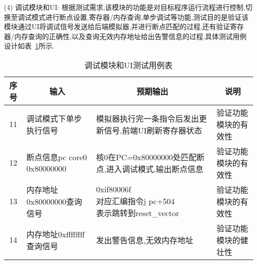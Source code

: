 (4) 调试模块和UI: 根据测试需求,该模块的功能是对目标程序运行流程进行控制,切换至调试模式进行断点设置,寄存器/内存查询,单步调试等功能,测试目的是验证该模块通过UI将调试信号发送给后端模拟器,并进行断点匹配的过程,还有验证寄存器/内存查询的正确性,以及查询无效内存地址给出告警信息的过程.具体测试用例设计如表~\ref{tab:test4}所示.
\begin{table}[h]
    \centering
    \caption{调试模块和UI测试用例表}
    \label{tab:test4}
    \begin{tabular}{clll}
      \toprule
      \multicolumn{1}{c}{序号} & \multicolumn{1}{c}{输入} & \multicolumn{1}{c}{预期输出} &\multicolumn{1}{c}{说明}\\
      \midrule
  11	& \multicolumn{1}{m{3cm}}{调试模式下单步执行信号} & \multicolumn{1}{m{4cm}}{模拟器执行完一条指令后发出更新信号,前端UI刷新寄存器状态} & \multicolumn{1}{m{3.5cm}}{验证功能模块的有效性}\\
  \hline
  12	& \multicolumn{1}{m{3cm}}{断点信息pc core0 0x80000000} & \multicolumn{1}{m{4cm}}{核0在PC=0x80000000处匹配断点,进入调试模式,输出断点信息} & \multicolumn{1}{m{3.5cm}}{验证功能模块的有效性}\\
  \hline
  13	& \multicolumn{1}{m{3cm}}{内存地址0x80000000查询信号} & \makecell[l]{0xif80006f\\
  对应汇编指令j pc+504\\
  表示跳转到reset\_vector
  } & \multicolumn{1}{m{3.5cm}}{验证功能模块的有效性}\\
  \hline
  14	& \multicolumn{1}{m{3cm}}{内存地址0xffffffff查询信号} & \multicolumn{1}{m{4cm}}{发出警告信息,无效内存地址} & \multicolumn{1}{m{3.5cm}}{验证功能模块的健壮性}\\
      \bottomrule
    \end{tabular}
\end{table}

